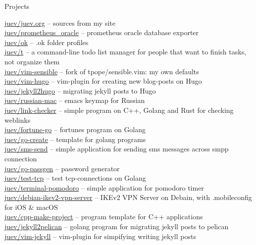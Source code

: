 \documentclass{resume} %
\begin{document}
\begin{rSection}{Projects}

\href{https://github.com/juev/juev.org}{juev/juev.org} -- sources from my site \\ %
\href{https://github.com/juev/prometheus\_oracle}{juev/prometheus\_oracle} -- prometheus oracle database exporter \\ %
\href{https://github.com/juev/ok}{juev/ok} -- .ok folder profiles  \\ %
\href{https://github.com/juev/t}{juev/t} -- a command-line todo list manager for people that want to finish tasks, not organize them \\ %
\href{https://github.com/juev/vim-sensible}{juev/vim-sensible} -- fork of tpope/sensible.vim: my own defaults \\ %
\href{https://github.com/juev/vim-hugo}{juev/vim-hugo} -- vim-plugin for creating new blog-posts on Hugo \\ %
\href{https://github.com/juev/jekyll2hugo}{juev/jekyll2hugo} -- migrating jekyll posts to Hugo \\ %
\href{https://github.com/juev/russian-mac}{juev/russian-mac} -- emacs keymap for Russian \\ %
\href{https://github.com/juev/link-checker}{juev/link-checker} -- simple program on C++, Golang and Rust for checking weblinks \\ %
\href{https://github.com/juev/fortune-go}{juev/fortune-go} -- fortunes program on Golang \\ %
\href{https://github.com/juev/go-create}{juev/go-create} -- template for golang programs \\ %
\href{https://github.com/juev/sms-send}{juev/sms-send} -- simple application for sending sms messages across smpp connection \\ %
\href{https://github.com/juev/go-passgen}{juev/go-passgen} -- password generator \\ %
\href{https://github.com/juev/test-tcp}{juev/test-tcp} -- test tcp-connections on Golang \\ %
\href{https://github.com/juev/terminal-pomodoro}{juev/terminal-pomodoro} -- simple application for pomodoro timer \\ %
\href{https://github.com/juev/debian-ikev2-vpn-server}{juev/debian-ikev2-vpn-server} -- IKEv2 VPN Server on Debain, with .mobileconfig for iOS \& macOS \\ %
\href{https://github.com/juev/cpp-make-project}{juev/cpp-make-project} -- program template for C++ applications \\ %
\href{https://github.com/juev/jekyll2pelican}{juev/jekyll2pelican} -- golang program for migrating jekyll posts to pelican \\ %
\href{https://github.com/juev/vim-jekyll}{juev/vim-jekyll} -- vim-plugin for simpifying writing jekyll posts \\ %

\end{rSection}
\end{document}
